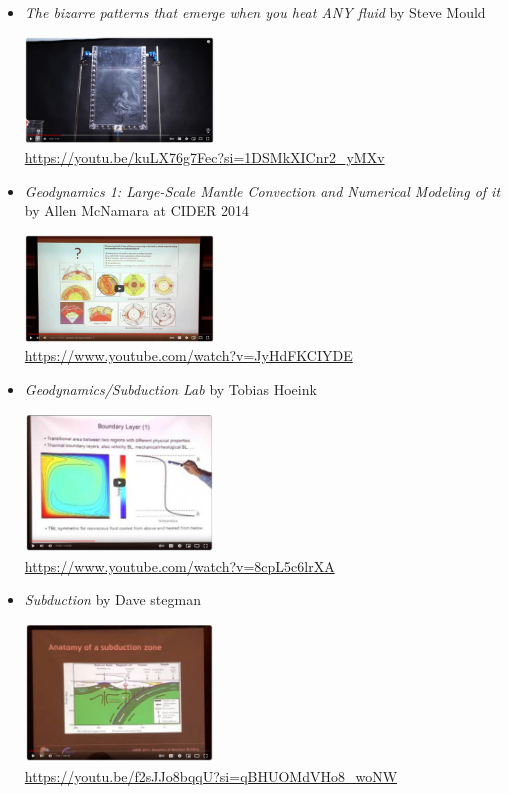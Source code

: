 \begin{itemize}
\item 
{\it The bizarre patterns that emerge when you heat ANY fluid} by Steve Mould
\begin{center}
\includegraphics[width=5cm]{images/chapter_md/vid_md_1}\\
{\captionfont \url{https://youtu.be/kuLX76g7Fec?si=1DSMkXICnr2_yMXv}}
\end{center}


\item 
{\it Geodynamics 1: Large-Scale Mantle Convection and Numerical Modeling of it} by Allen McNamara at CIDER 2014

\begin{center}
\includegraphics[width=5cm]{images/chapter_md/vid_md_2}\\
{\captionfont \url{https://www.youtube.com/watch?v=JyHdFKCIYDE}}
\end{center}

\item {\it Geodynamics/Subduction Lab} by Tobias Hoeink

\begin{center}
\includegraphics[width=5cm]{images/chapter_md/vid_md_3}\\
{\captionfont \url{https://www.youtube.com/watch?v=8cpL5c6lrXA}}
\end{center}

\item 
{\it Subduction} by Dave stegman

\begin{center}
\includegraphics[width=5cm]{images/chapter_md/vid_md_4}\\
{\captionfont \url{https://youtu.be/f2sJJo8bqqU?si=qBHUOMdVHo8_woNW}}
\end{center}

\end{itemize}


